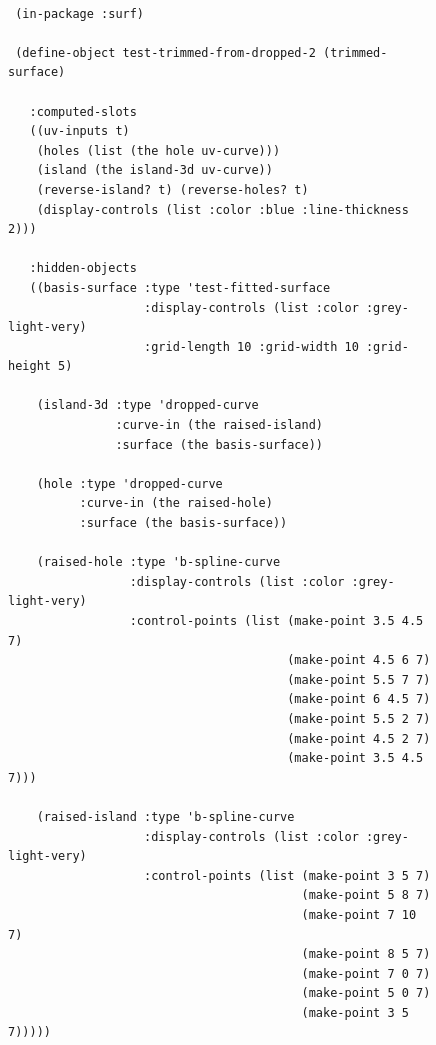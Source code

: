 \documentclass [11pt]{book}
\begin{document}
\begin{itemize}
\begin{description}
\end{description}




\begin{figure}
\begin{lrbox}{\boxedverb}
\begin{minipage}{\linewidth}
{\small

\begin{verbatim}
                  
 (in-package :surf)

 (define-object test-trimmed-from-dropped-2 (trimmed-surface)

   :computed-slots
   ((uv-inputs t)
    (holes (list (the hole uv-curve)))
    (island (the island-3d uv-curve))
    (reverse-island? t) (reverse-holes? t)
    (display-controls (list :color :blue :line-thickness 2)))
  
   :hidden-objects
   ((basis-surface :type 'test-fitted-surface
                   :display-controls (list :color :grey-light-very)
                   :grid-length 10 :grid-width 10 :grid-height 5)
   
    (island-3d :type 'dropped-curve
               :curve-in (the raised-island)
               :surface (the basis-surface))
   
    (hole :type 'dropped-curve
          :curve-in (the raised-hole)
          :surface (the basis-surface))
   
    (raised-hole :type 'b-spline-curve
                 :display-controls (list :color :grey-light-very)
                 :control-points (list (make-point 3.5 4.5 7) 
                                       (make-point 4.5 6 7) 
                                       (make-point 5.5 7 7) 
                                       (make-point 6 4.5 7) 
                                       (make-point 5.5 2 7) 
                                       (make-point 4.5 2 7) 
                                       (make-point 3.5 4.5 7)))
    
    (raised-island :type 'b-spline-curve
                   :display-controls (list :color :grey-light-very)
                   :control-points (list (make-point 3 5 7) 
                                         (make-point 5 8 7) 
                                         (make-point 7 10 7) 
                                         (make-point 8 5 7) 
                                         (make-point 7 0 7) 
                                         (make-point 5 0 7) 
                                         (make-point 3 5 7)))))


\end{verbatim}}
\end{minipage}
\end{lrbox}
\end{figure}
\end{itemize}
\end{document}
